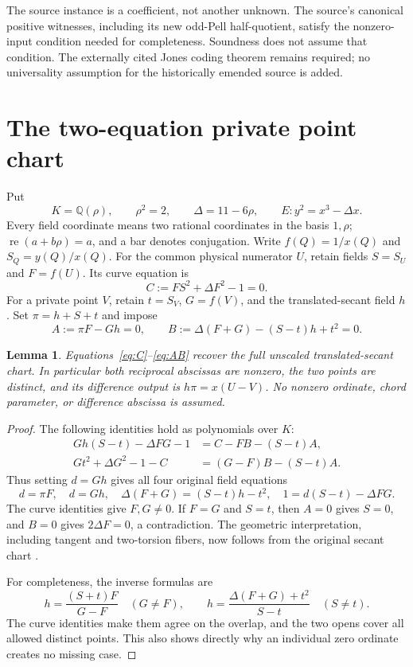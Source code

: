 \documentclass[11pt]{article}
\newtheorem{lemma}[theorem]{Lemma}
\newcommand{\Q}{\mathbb Q}\newcommand{\Z}{\mathbb Z}
\newcommand{\re}{\operatorname{re}}
\begin{document}
The source instance is a coefficient, not another unknown. The source's
canonical positive witnesses, including its new odd-Pell half-quotient,
satisfy the nonzero-input condition needed for completeness. Soundness
does not assume that condition. The externally cited Jones coding
theorem remains required; no universality assumption for the historically
emended source is added.

\section{The two-equation private point chart}

Put
\[
 K=\Q(\rho),\qquad \rho^2=2,\qquad \Delta=11-6\rho,
 \qquad E:y^2=x^3-\Delta x.
\]
Every field coordinate means two rational coordinates in the basis
\(1,\rho\); \(\re(a+b\rho)=a\), and a bar denotes conjugation.
Write \(f(Q)=1/x(Q)\) and \(S_Q=y(Q)/x(Q)\). For the common physical
numerator \(U\), retain fields \(S=S_U\) and \(F=f(U)\). Its curve
equation is
\begin{equation}\label{eq:C}
                    C:=FS^2+\Delta F^2-1=0.
\end{equation}
For a private point \(V\), retain \(t=S_V\), \(G=f(V)\), and the
translated-secant field \(h\). Set \(\pi=h+S+t\) and impose
\begin{equation}\label{eq:AB}
 A:=\pi F-Gh=0,\qquad
 B:=\Delta(F+G)-(S-t)h+t^2=0.
\end{equation}

\begin{lemma}\label{lem:chart}
Equations~\eqref{eq:C}--\eqref{eq:AB} recover the full unscaled
translated-secant chart. In particular both reciprocal abscissas are
nonzero, the two points are distinct, and its difference output is
\(h\pi=x(U-V)\). No nonzero ordinate, chord parameter, or difference
abscissa is assumed.
\end{lemma}
\begin{proof}
The following identities hold as polynomials over \(K\):
\begin{align}
 Gh(S-t)-\Delta FG-1
   &=C-FB-(S-t)A, \label{eq:scale}\\
 Gt^2+\Delta G^2-1-C
   &=(G-F)B-(S-t)A. \label{eq:privatecurve}
\end{align}
Thus setting \(d=Gh\) gives all four original field equations
\[
 d=\pi F,\quad d=Gh,\quad
 \Delta(F+G)=(S-t)h-t^2,\quad
 1=d(S-t)-\Delta FG.
\]
The curve identities give \(F,G\ne0\). If \(F=G\) and \(S=t\),
then \(A=0\) gives \(S=0\), and \(B=0\) gives \(2\Delta F=0\),
a contradiction. The geometric interpretation, including tangent and
two-torsion fibers, now follows from the original secant chart
\cite[Proposition 2.1]{secant}.

For completeness, the inverse formulas are
\[
 h=\frac{(S+t)F}{G-F}\quad(G\ne F),\qquad
 h=\frac{\Delta(F+G)+t^2}{S-t}\quad(S\ne t).
\]
The curve identities make them agree on the overlap, and the two opens
cover all allowed distinct points. This also shows directly why an
individual zero ordinate creates no missing case.
\end{proof}
\end{document}
